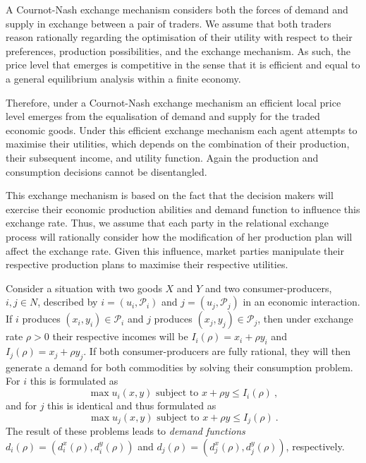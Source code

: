A Cournot-Nash exchange mechanism considers both the forces of demand and supply in exchange between a pair of traders. We assume that both traders reason rationally regarding the optimisation of their utility with respect to their preferences, production possibilities, and the exchange mechanism. As such, the price level that emerges is competitive in the sense that it is efficient and equal to a general equilibrium analysis within a finite economy.

Therefore, under a Cournot-Nash exchange mechanism an efficient local price level emerges from the equalisation of demand and supply for the traded economic goods. Under this efficient exchange mechanism each agent attempts to maximise their utilities, which depends on the combination of their production, their subsequent income, and utility function. Again the production and consumption decisions cannot be disentangled.

This exchange mechanism is based on the fact that the decision makers will exercise their economic production abilities and demand function to influence this exchange rate. Thus, we assume that each party in the relational exchange process will rationally consider how the modification of her production plan will affect the exchange rate. Given this influence, market parties manipulate their respective production plans to maximise their respective utilities.

Consider a situation with two goods $X$ and $Y$ and two consumer-producers, $i,j \in N$, described by $i = (u_{i}, \mathcal{P}_{i})$ and $j = (u_{j}, \mathcal{P}_{j})$ in an economic interaction. If $i$ produces $(x_{i}, y_{i}) \in \mathcal{P}_{i}$ and $j$ produces $(x_{j}, y_{j}) \in \mathcal{P}_{j}$, then under exchange rate $\rho > 0$ their respective incomes will be $I_{i}(\rho) = x_{i} + \rho y_{i}$ and $I_{j}(\rho) = x_{j} + \rho y_{j}$. If both consumer-producers are fully rational, they will then generate a demand for both commodities by solving their consumption problem. For $i$ this is formulated as
\begin{equation}
\max u_{i}(x,y) \mbox{ subject to } x + \rho y \leqslant I_{i}(\rho) ~ ,
\end{equation}
and for $j$ this is identical and thus formulated as
\begin{equation}
\max u_{j}(x,y) \mbox{ subject to } x + \rho y \leqslant I_{j}(\rho) ~ .
\end{equation}
The result of these problems leads to \emph{demand functions} $d_{i}(\rho) = \left( d^{x}_{i}(\rho), d^{y}_{i}(\rho) \right)$ and $d_{j}(\rho) = \left( d^{x}_{j}(\rho), d^{y}_{j}(\rho) \right)$, respectively.

